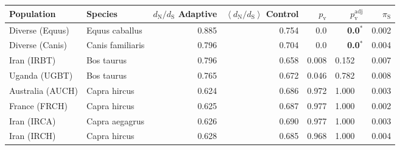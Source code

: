 \begin{center}
\begin{adjustbox}{width = 1\textwidth}
\begin{tabular}{|l|l|r|r|r|r|r|}
\toprule
                     Population &              Species & \specialcell{$d_{\mathrm{N}} / d_{\mathrm{S}}$ \\ Adaptive} & \specialcell{$\left< d_{\mathrm{N}} / d_{\mathrm{S}} \right>$ \\ Control} & $p_{\mathrm{v}}$ & $p_{\mathrm{v}}^{\mathrm{adj}}$ & $\pi_{\textrm{S}}$ \\
\midrule
                Diverse (Equus) &       Equus caballus &                                              0.885 &                                              0.754 &              0.0 &                    \textbf{0.0}$\bm{^*}$ &              0.002 \\
                Diverse (Canis) &     Canis familiaris &                                              0.796 &                                              0.704 &              0.0 &                    \textbf{0.0}$\bm{^*}$ &              0.004 \\
                    Iran (IRBT) &           Bos taurus &                                              0.796 &                                              0.658 &            0.008 &                         0.152~~ &              0.007 \\
                  Uganda (UGBT) &           Bos taurus &                                              0.765 &                                              0.672 &            0.046 &                         0.782~~ &              0.008 \\
               Australia (AUCH) &         Capra hircus &                                              0.624 &                                              0.686 &            0.972 &                         1.000~~ &              0.003 \\
                  France (FRCH) &         Capra hircus &                                              0.625 &                                              0.687 &            0.977 &                         1.000~~ &              0.002 \\
                    Iran (IRCA) &       Capra aegagrus &                                              0.626 &                                              0.690 &            0.977 &                         1.000~~ &              0.003 \\
                    Iran (IRCH) &         Capra hircus &                                              0.628 &                                              0.685 &            0.968 &                         1.000~~ &              0.004 \\

\end{tabular}
\end{adjustbox}
\end{center}

